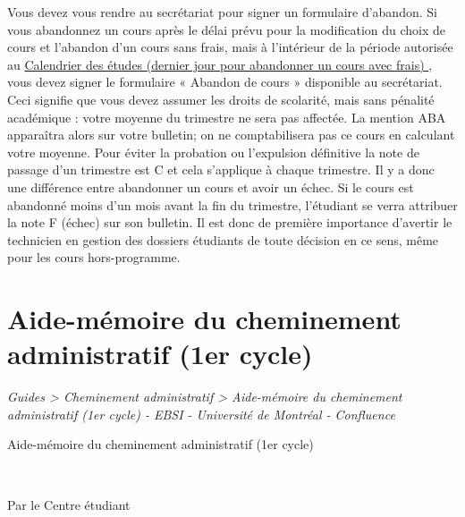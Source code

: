 \documentclass [12 pt]{article}
\begin{document}
            Vous devez vous rendre au secrétariat pour signer un formulaire d'abandon. Si vous
                abandonnez un cours après le délai prévu pour la modification du
                choix de cours et l'abandon d'un cours sans frais, mais à l'intérieur de la période
                autorisée au 
        \href{
        /pages/viewpage.action?pageId=124097784
        } {
        Calendrier des
                        études (dernier jour pour abandonner un cours avec frais)
        }
    , vous
                devez signer le formulaire « Abandon de cours » disponible au secrétariat. Ceci
                signifie que vous devez assumer les droits de scolarité, mais sans pénalité
                académique : votre moyenne du trimestre ne sera pas affectée. La mention
                    ABA apparaîtra alors sur votre bulletin; on ne comptabilisera
                pas ce cours en calculant votre moyenne. Pour éviter la probation ou l'expulsion
                définitive la note de passage d'un trimestre est C et cela
                s'applique à chaque trimestre. Il y a donc une différence entre abandonner un cours
                et avoir un échec.
            Si le cours est abandonné moins d'un mois avant la fin du trimestre, l'étudiant se
                verra attribuer la note F (échec) sur son bulletin. Il est donc de
                première importance d'avertir le technicien en gestion des dossiers étudiants de
                toute décision en ce sens, même pour les cours hors-programme.
        
    
    
        \newpage
        \section {
        Aide-mémoire du cheminement administratif (1er cycle)
        }
        
        
        
        \textit{
        Guides > Cheminement administratif > Aide-mémoire du cheminement administratif
            (1er cycle) - EBSI - Université de Montréal - Confluence
        }
    
        Aide-mémoire du cheminement administratif (1er cycle)
        
            
                
                    
                        
                             
                            
                                Par le Centre étudiant
                            
\end{document}
